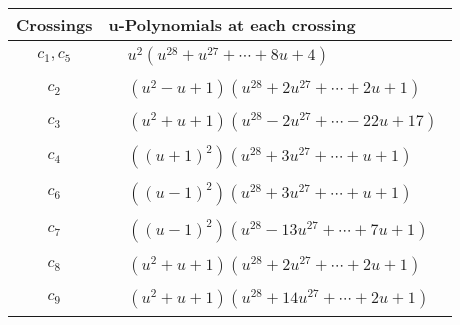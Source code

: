 \documentclass[1p]{elsarticle_modified}
\theoremstyle{definition}
\begin{document}
\begin{tabular}{m{50pt}|m{274pt}}
Crossings & \hspace{64pt}u-Polynomials at each crossing \\
\hline $$\begin{aligned}c_{1},c_{5}\end{aligned}$$&$\begin{aligned}
&u^2(u^{28}+u^{27}+\cdots+8 u+4)
\end{aligned}$\\
\hline $$\begin{aligned}c_{2}\end{aligned}$$&$\begin{aligned}
&(u^2- u+1)(u^{28}+2 u^{27}+\cdots+2 u+1)
\end{aligned}$\\
\hline $$\begin{aligned}c_{3}\end{aligned}$$&$\begin{aligned}
&(u^2+u+1)(u^{28}-2 u^{27}+\cdots-22 u+17)
\end{aligned}$\\
\hline $$\begin{aligned}c_{4}\end{aligned}$$&$\begin{aligned}
&((u+1)^2)(u^{28}+3 u^{27}+\cdots+u+1)
\end{aligned}$\\
\hline $$\begin{aligned}c_{6}\end{aligned}$$&$\begin{aligned}
&((u-1)^2)(u^{28}+3 u^{27}+\cdots+u+1)
\end{aligned}$\\
\hline $$\begin{aligned}c_{7}\end{aligned}$$&$\begin{aligned}
&((u-1)^2)(u^{28}-13 u^{27}+\cdots+7 u+1)
\end{aligned}$\\
\hline $$\begin{aligned}c_{8}\end{aligned}$$&$\begin{aligned}
&(u^2+u+1)(u^{28}+2 u^{27}+\cdots+2 u+1)
\end{aligned}$\\
\hline $$\begin{aligned}c_{9}\end{aligned}$$&$\begin{aligned}
&(u^2+u+1)(u^{28}+14 u^{27}+\cdots+2 u+1)
\end{aligned}$\\
\hline
\end{tabular}\newpage\renewcommand{\arraystretch}{1}
\end{document}
